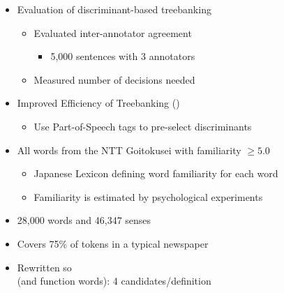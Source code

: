 \documentclass[a4paper,landscape,headrule,footrule,xetex]{foils}
\begin{document}
\begin{itemize}
\item Evaluation of discriminant-based treebanking
  \begin{itemize}
  \item Evaluated inter-annotator agreement 
    \begin{itemize}
    \item 5,000 sentences with 3 annotators
    \end{itemize}
  \item Measured number of decisions needed
  \end{itemize}
\item Improved Efficiency of Treebanking ()
  \begin{itemize}
  \item Use Part-of-Speech tags to pre-select discriminants
  \end{itemize}
\end{itemize}



\begin{itemize}
\item All words from the NTT Goitokusei with familiarity $\ge 5.0$
  \begin{itemize}
    \item Japanese Lexicon defining word familiarity for each word
    \item Familiarity is estimated by psychological experiments
  \end{itemize}
\item 28,000 words and 46,347 senses
\item Covers 75\% of tokens in a typical newspaper
\item Rewritten so  \\
(and function words): 4 candidates/definition
\end{itemize}



\end{document}

